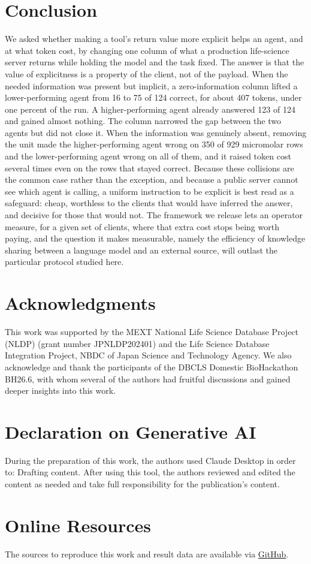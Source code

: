 \documentclass[sigconf]{ceurart}
\begin{document}
\section{Conclusion}
 
We asked whether making a tool's return value more explicit helps an agent, and at
what token cost, by changing one column of what a production life-science server
returns while holding the model and the task fixed. The answer is that the value of
explicitness is a property of the client, not of the payload. When the needed
information was present but implicit, a zero-information column lifted a
lower-performing agent from 16 to 75 of 124 correct, for about 407 tokens, under one
percent of the run. A higher-performing agent already answered 123 of 124 and gained
almost nothing. The column narrowed the gap between the two agents but did not close
it. When the information was genuinely absent, removing the unit made the
higher-performing agent wrong on 350 of 929 micromolar rows and the lower-performing
agent wrong on all of them, and it raised token cost several times even on the rows
that stayed correct. Because these collisions are the common case rather than the
exception, and because a public server cannot see which agent is calling, a uniform
instruction to be explicit is best read as a safeguard: cheap, worthless to the
clients that would have inferred the answer, and decisive for those that would not.
The framework we release lets an operator measure, for a given set of clients,
where that extra cost stops being worth paying, and the question it makes measurable,
namely the efficiency of knowledge sharing between a language model and an external
source, will outlast the particular protocol studied here.

\section{Acknowledgments}
This work was supported by the MEXT National Life Science Database Project (NLDP) (grant number JPNLDP202401) and the Life Science Database Integration Project, NBDC of Japan Science and Technology Agency.
We also acknowledge and thank the participants of the DBCLS Domestic BioHackathon BH26.6, with whom several of the authors had fruitful discussions and gained deeper insights into this work.

\section*{Declaration on Generative AI}
  
 During the preparation of this work, the authors used Claude Desktop in order to: Drafting content. After using this tool, the authors reviewed and edited the content as needed and take full responsibility for the publication’s content. 
 


\section{Online Resources}

The sources to reproduce this work and result data are available via
\href{https://github.com/dbcls/mcp-return-value-study}{GitHub}.
\end{document}
